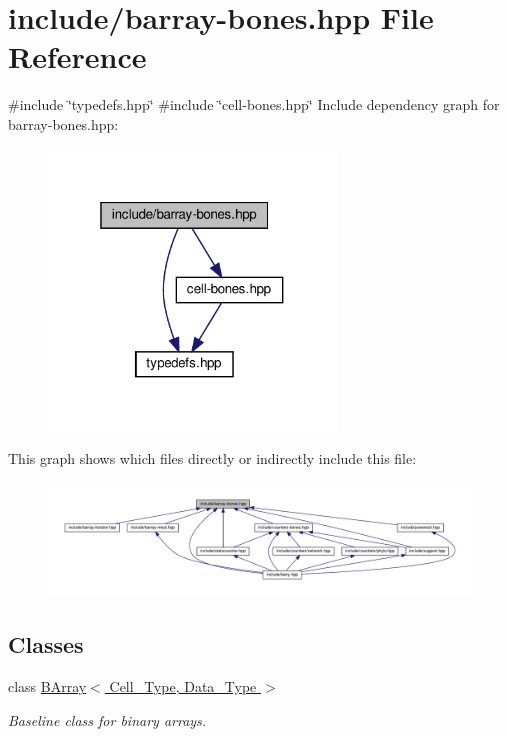\hypertarget{barray-bones_8hpp}{}\section{include/barray-\/bones.hpp File Reference}
\label{barray-bones_8hpp}
{\ttfamily \#include \char`\"{}typedefs.\+hpp\char`\"{}}\newline
{\ttfamily \#include \char`\"{}cell-\/bones.\+hpp\char`\"{}}\newline
Include dependency graph for barray-\/bones.hpp\+:\nopagebreak
\begin{figure}[H]
\begin{center}
\leavevmode
\includegraphics[width=217pt]{barray-bones_8hpp__incl}
\end{center}
\end{figure}
This graph shows which files directly or indirectly include this file\+:\nopagebreak
\begin{figure}[H]
\begin{center}
\leavevmode
\includegraphics[width=350pt]{barray-bones_8hpp__dep__incl}
\end{center}
\end{figure}
\subsection*{Classes}
\begin{DoxyCompactItemize}
\item 
class \hyperlink{class_b_array}{B\+Array$<$ Cell\+\_\+\+Type, Data\+\_\+\+Type $>$}
\begin{DoxyCompactList}\small\item\em Baseline class for binary arrays. \end{DoxyCompactList}\end{DoxyCompactItemize}
